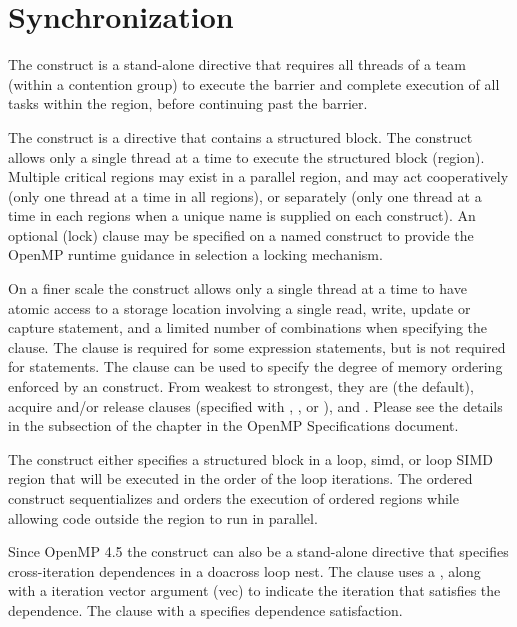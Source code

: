 \pagebreak
\chapter{Synchronization}
\label{chap:synchronization}

The  construct is a stand-alone directive that requires all threads
of a team (within a contention group) to execute the barrier and complete
execution of all tasks within the region, before continuing past the barrier.

The  construct is a directive that contains a structured block. 
The construct allows only a single thread at a time to execute the structured block (region).
Multiple critical regions may exist in a parallel region, and may
act cooperatively (only one thread at a time in all  regions),
or separately (only one thread at a time in each  regions when
a unique name is supplied on each  construct).
An optional (lock)  clause may be specified on a named  
construct to provide the OpenMP runtime guidance in selection a locking 
mechanism.

On a finer scale the  construct allows only a single thread at 
a time to have atomic access to a storage location involving a single read, 
write, update or capture statement, and a limited number of combinations 
when specifying the   clause.  The
 clause is required for some expression statements, but is
not required for  statements. The  clause can be
used to specify the degree of memory ordering enforced by an 
construct. From weakest to strongest, they are  (the default),
acquire and/or release clauses (specified with , ,
or ), and .  Please see the details in the
 subsection of the  chapter in the OpenMP
Specifications document.

The  construct either specifies a structured block in a loop, 
simd, or loop SIMD region that will be executed in the order of the loop 
iterations.  The ordered construct sequentializes and orders the execution 
of ordered regions while allowing code outside the region to run in parallel.

Since OpenMP 4.5 the  construct can also be a stand-alone 
directive that specifies cross-iteration dependences in a doacross loop nest.  
The  clause uses a  , along with a 
iteration vector argument (vec) to indicate the iteration that satisfies the 
dependence.  The  clause with a 
 specifies dependence satisfaction.

